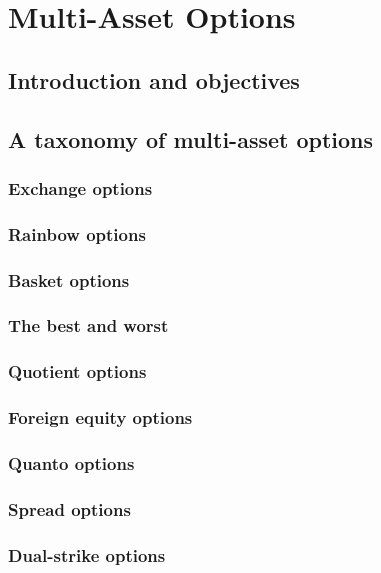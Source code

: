 \chapter{Multi-Asset Options}

\section{Introduction and objectives}

\section{A taxonomy of multi-asset options}

\subsection{Exchange options}

\subsection{Rainbow options}

\subsection{Basket options}

\subsection{The best and worst}

\subsection{Quotient options}

\subsection{Foreign equity options}

\subsection{Quanto options}

\subsection{Spread options}

\subsection{Dual-strike options}

